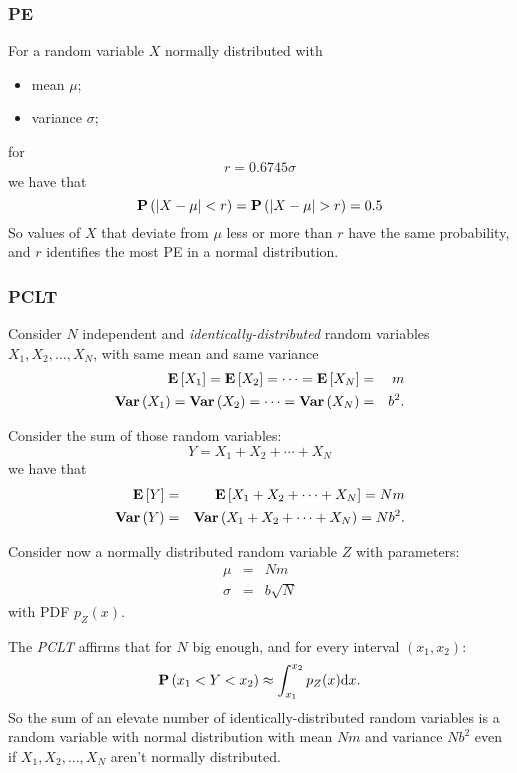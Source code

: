 \documentclass[dissertation.tex]{subfiles}
\begin{document}
\subsubsection{\ac{PE}}
For a random variable $X$ normally distributed with
\begin{itemize}
\item mean $\mu$;
\item variance $\sigma$;
\end{itemize}
for
\begin{equation*}
  r=0.6745\sigma
\end{equation*}
we have that
\begin{equation*}
  \prob{\abs{X-\mu}<r} = \prob{\abs{X-\mu}>r} = 0.5
\end{equation*}
So values of $X$ that deviate from $\mu$ less or more than $r$ have the
same probability, and $r$ identifies the most \ac{PE} in a
normal distribution.
\subsubsection{\acf{PCLT}}
Consider $N$ independent and \emph{identically-distributed} random variables
$X_1,X_2,\dots,X_N$, with same mean and same variance
\begin{eqnarray*}
  \mathrm{\textbf{E}}\left[X_1\right]=\mathrm{\textbf{E}}\left[X_2\right]=\dots=\mathrm{\textbf{E}}\left[X_N\right]&=&m\\
  \mathrm{\textbf{Var}}\left(X_1\right)=\mathrm{\textbf{Var}}\left(X_2\right)=\dots=\mathrm{\textbf{Var}}\left(X_N\right)&=&b^2.
\end{eqnarray*}

Consider the sum of those random variables:
\begin{equation*}
  Y = X_1+X_2+\cdots+X_N
\end{equation*}
we have that
\begin{eqnarray*}
  \mathrm{\textbf{E}}\left[Y\right]&=&\mathrm{\textbf{E}}\left[X_1+X_2+\cdots+X_N\right]=Nm\\
  \mathrm{\textbf{Var}}\left(Y\right)&=&\mathrm{\textbf{Var}}\left(X_1+X_2+\cdots+X_N\right)=Nb^2.
\end{eqnarray*}

Consider now a normally distributed random variable $Z$ with
parameters:
\begin{eqnarray*}
  \mu&=&Nm\\
  \sigma&=&b\sqrt{N}
\end{eqnarray*}
with \ac{PDF} $p_Z(x)$.

The \emph{\ac{PCLT}} affirms that for $N$ big
enough, and for every interval $(x_1,x_2)$:
\begin{equation}\label{eq:tcl}
  \mathrm{\textbf{P}}\left(x_1<Y<x_2\right)\approx\int_{x_1}^{x_2}p_Z(x) \mathrm{d} x.
\end{equation}
So the sum of an elevate number of identically-distributed random
variables is a random variable with normal distribution with mean $Nm$
and variance $Nb^2$ even if
$X_1,X_2,\dots,X_N$ aren't normally distributed.
\end{document}
